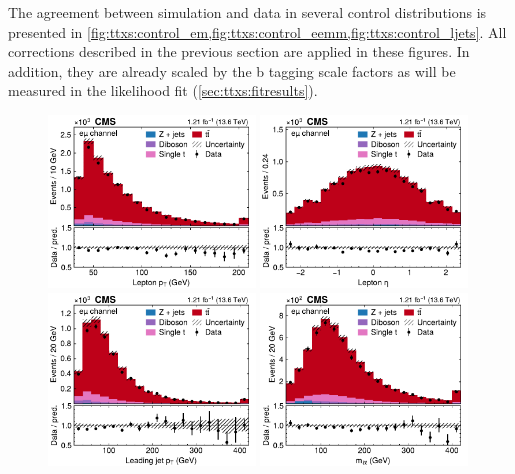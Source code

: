 The agreement between simulation and data in several control distributions is presented in \cref{fig:ttxs:control_em,fig:ttxs:control_eemm,fig:ttxs:control_ljets}. All corrections described in the previous section are applied in these figures. In addition, they are already scaled by the b tagging scale factors as will be measured in the likelihood fit (\cref{sec:ttxs:fitresults}).

\begin{figure}[!hp]
\centering
\includegraphics[width=0.49\textwidth]{figures/ttxs/lep_pt_em.pdf}
\hfill
\includegraphics[width=0.49\textwidth]{figures/ttxs/lep_eta_em.pdf}
\includegraphics[width=0.49\textwidth]{figures/ttxs/1st_jet_pt_em.pdf}
\hfill
\includegraphics[width=0.49\textwidth]{figures/ttxs/mll_em.pdf}

\end{figure}

